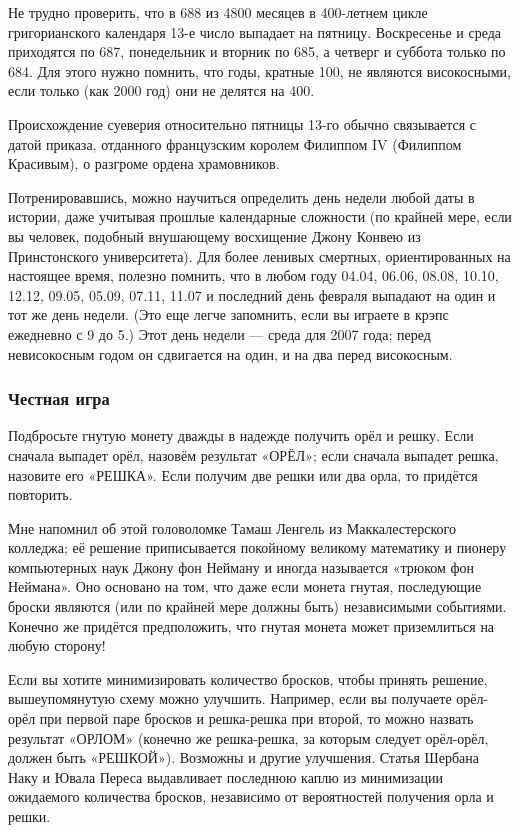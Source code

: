 Не трудно проверить, что в 688 из 4800 месяцев в 400-летнем цикле григорианского календаря 13-е число выпадает на пятницу.
Воскресенье и среда приходятся по 687, понедельник и вторник по 685, а четверг и суббота только по 684.
Для этого нужно помнить, что годы, кратные 100, не являются високосными, если только (как 2000 год) они не делятся на 400.

Происхождение суеверия относительно пятницы 13-го обычно связывается с датой приказа, отданного французским королем Филиппом IV (Филиппом Красивым), о разгроме ордена храмовников.

Потренировавшись, можно научиться определить день недели любой даты в истории, даже учитывая прошлые календарные сложности
(по крайней мере, если вы человек, подобный внушающему восхищение Джону Конвею из Принстонского университета).
Для более ленивых смертных, ориентированных на настоящее время, полезно помнить, что в любом году
04.04, 06.06, 08.08, 10.10, 12.12, 09.05, 05.09, 07.11, 11.07 и последний день февраля выпадают на один и тот же день недели.
(Это еще легче запомнить, если вы играете в крэпс ежедневно с 9 до 5.)
Этот день недели --- среда для 2007 года;
перед невисокосным годом он сдвигается на один, и на два перед високосным.

\subsubsection*{Честная игра}

Подбросьте гнутую монету дважды в надежде получить орёл и решку.
Если сначала выпадет орёл, назовём результат «ОРЁЛ»;
если сначала выпадет решка, назовите его «РЕШКА».
Если получим две решки или два орла, то придётся повторить.

Мне напомнил об этой головоломке Тамаш Ленгель из Маккалестерского колледжа;
её решение приписывается покойному великому математику и пионеру компьютерных наук Джону фон Нейману и иногда называется «трюком фон Неймана».
Оно основано на том, что даже если монета гнутая, последующие броски являются (или по крайней мере должны быть) независимыми событиями.
Конечно же придётся предположить, что гнутая монета может приземлиться на любую сторону!

Если вы хотите минимизировать количество бросков, чтобы принять решение, вышеупомянутую схему можно улучшить. Например, если вы получаете орёл-орёл при первой паре бросков и решка-решка при второй, то можно назвать результат «ОРЛОМ» (конечно же решка-решка, за которым следует орёл-орёл, должен быть «РЕШКОЙ»).
Возможны и другие улучшения.
Статья Шербана Наку и Ювала Переса \cite{nacu-peres} выдавливает последнюю каплю из минимизации ожидаемого количества бросков, независимо от вероятностей получения орла и решки.

